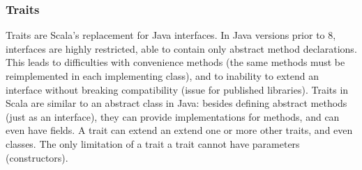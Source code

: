 \subsubsection{Traits}

Traits are Scala's replacement for Java interfaces. In Java versions prior to 8, interfaces are highly restricted, able to contain only abstract method declarations. This leads to difficulties with convenience methods (the same methods must be reimplemented in each implementing class), and to inability to extend an interface without breaking compatibility (issue for published libraries). Traits in Scala are similar to an abstract class in Java: besides defining abstract methods (just as an interface), they can provide implementations for methods, and can even have fields. A trait can extend an extend one or more other traits, and even classes. The only limitation of a trait a trait cannot have parameters (constructors).

